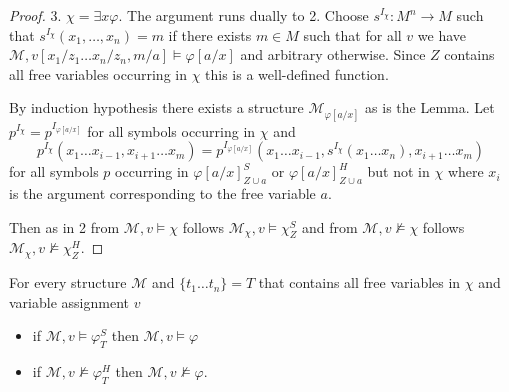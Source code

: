 \documentclass[a4paper,UKenglish,cleveref, autoref, thm-restate]{lipics-v2021}
\begin{document}
\begin{proof}
	3. $\chi = \exists x\varphi$. The argument runs dually to 2. Choose $s^{I_\chi}:M^n\to M$ such that $s^{I_\chi}(x_1,\dots, x_n) = m$ if there exists $m\in M$ such that for all $v$ we have $\mathcal M, v[x_1/z_1\dots x_n/z_n, m/a]\models\varphi[a/x]$ and arbitrary otherwise. Since $Z$ contains all free variables occurring in $\chi$ this is a well-defined function.
	
	By induction hypothesis there exists a structure $\mathcal M_{\varphi[a/x]}$ as is the Lemma. Let $p^{I_\chi} = p^{I_{\varphi[a/x]}}$ for all symbols occurring in $\chi$ and $$p^{I_\chi}(x_1\dots x_{i-1}, x_{i+1}\dots x_m) = p^{I_{\varphi[a/x]}}(x_1\dots x_{i-1}, s^{I_\chi}(x_1\dots x_n), x_{i+1}\dots x_m)$$ for all symbols $p$ occurring in $\varphi[a/x]^S_{Z\cup a}$ or $\varphi[a/x]^H_{Z\cup a}$ but not in $\chi$ where $x_i$ is the argument corresponding to the free variable $a$.
	
	Then as in 2 from $\mathcal M, v\models \chi$ follows $\mathcal M_\chi,v\models\chi^S_Z$ and from $\mathcal M, v\not\models \chi$ follows $\mathcal M_\chi,v\not\models\chi^H_Z$.
\end{proof}

\begin{lemma}\label{ap2}
	For every structure $\mathcal M$ and $\{t_1\dots t_n\} = T$ that contains all free variables in $\chi$ and variable assignment $v$
	\begin{itemize}
		\item if $\mathcal M, v\models\varphi^S_T$ then $\mathcal M, v\models \varphi$
		\item if $\mathcal M, v\not\models\varphi^H_T$ then $\mathcal M, v\not\models\varphi$.
	\end{itemize}
\end{lemma}
\end{document}
